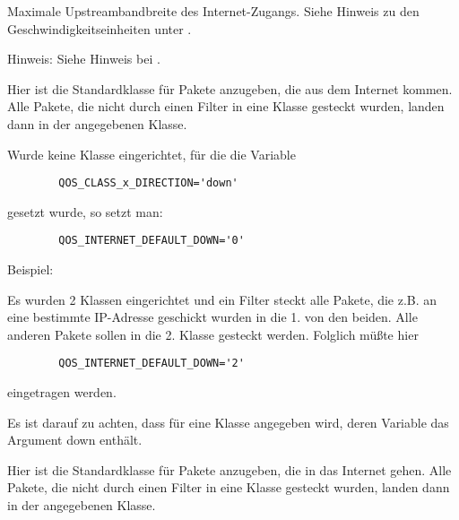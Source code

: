 \begin{description}

   Maximale Upstreambandbreite des Internet-Zugangs. Siehe Hinweis zu den
   Geschwindigkeitseinheiten unter .

   Hinweis: Siehe Hinweis bei .



   Hier ist die Standardklasse für Pakete anzugeben, die aus dem Internet
   kommen. Alle Pakete, die nicht durch einen Filter in eine Klasse
   gesteckt wurden, landen dann in der angegebenen Klasse.

   Wurde keine Klasse eingerichtet, für die die Variable
\begin{example}
\begin{verbatim}
        QOS_CLASS_x_DIRECTION='down'
\end{verbatim}
\end{example}
   gesetzt wurde, so setzt man:
\begin{example}
\begin{verbatim}
        QOS_INTERNET_DEFAULT_DOWN='0'
\end{verbatim}
\end{example}

   Beispiel:

   Es wurden 2 Klassen eingerichtet und ein Filter steckt alle Pakete,
   die z.B. an eine bestimmte IP-Adresse geschickt wurden in die 1. von
   den beiden. Alle anderen Pakete sollen in die 2. Klasse gesteckt
   werden. Folglich müßte hier

\begin{example}
\begin{verbatim}
        QOS_INTERNET_DEFAULT_DOWN='2'
\end{verbatim}
\end{example}

   eingetragen werden.

   Es ist darauf zu achten, dass für  eine Klasse
   angegeben wird, deren  Variable das Argument
   down enthält.



   Hier ist die Standardklasse für Pakete anzugeben, die in das Internet
   gehen. Alle Pakete, die nicht durch einen Filter in eine Klasse
   gesteckt wurden, landen dann in der angegebenen Klasse.


\end{description}
